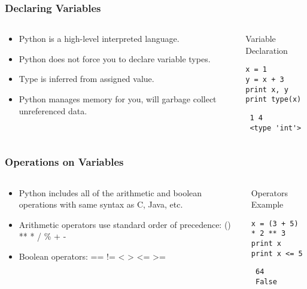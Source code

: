 \documentclass[bigger]{beamer}
\begin{document}
\begin{frame}[fragile]
\frametitle{Declaring Variables}
\label{sec-1-2}
\begin{columns}
\begin{column}{0.6\textwidth}
\label{sec-1-2-1}

\begin{itemize}
\item Python is a high-level interpreted language.
\item Python does not force you to declare variable types.
\item Type is inferred from assigned value.
\item Python manages memory for you, will garbage collect unreferenced data.
\end{itemize}
\end{column}
\begin{column}{0.4\textwidth}
\begin{block}{Variable Declaration}
\label{sec-1-2-2}

\fontsize{6}{7.2}\selectfont

\begin{verbatim}
x = 1
y = x + 3
print x, y
print type(x)
\end{verbatim}

\begin{verbatim}
 1 4
 <type 'int'>
\end{verbatim}
\end{block}
\end{column}
\end{columns}
\end{frame}
\begin{frame}[fragile]
\frametitle{Operations on Variables}
\label{sec-1-3}
\begin{columns}
\begin{column}{0.6\textwidth}
\label{sec-1-3-1}

\begin{itemize}
\item Python includes all of the arithmetic and boolean operations with same syntax as C, Java, etc.
\item Arithmetic operators use standard order of precedence: () ** * / \% + -
\item Boolean operators: == != < > <= >=
\end{itemize}
\end{column}
\begin{column}{0.4\textwidth}
\begin{block}{Operators Example}
\label{sec-1-3-2}

\fontsize{6}{7.2}\selectfont

\begin{verbatim}
x = (3 + 5) * 2 ** 3
print x
print x <= 5
\end{verbatim}

\begin{verbatim}
 64
 False
\end{verbatim}
\end{block}
\end{column}
\end{columns}
\end{frame}
\end{document}
